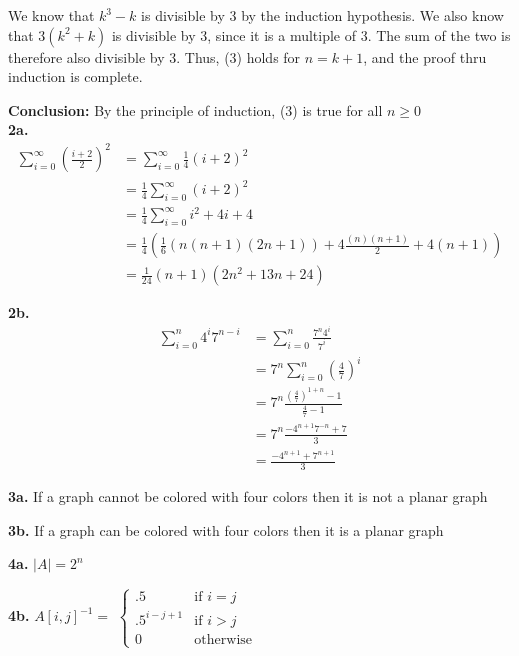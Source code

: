 \documentclass[12pt]{article}
\begin{document}
	
	We know that $ k^3 -k $ is divisible by 3 by the induction hypothesis. We also know that $ 3(k^2 + k )$ is divisible by 3, since it is a multiple of 3. The sum of the two is therefore also divisible by 3.   	Thus, (3) holds for $ n = k + 1 $, and the proof thru induction  is complete.

	\textbf{Conclusion:} By the principle of induction, (3) is true for all $ n \geq 0 $ \\
	
	\textbf{2a.} 
	\begin{equation}
	\begin{split}
	\sum_{i=0}^{\infty} (\frac{i+2}{2})^2 & = \sum_{i=0}^{\infty} \frac{1}{4} (i+2)^2\\
	& = \frac{1}{4} \sum_{i=0}^{\infty} (i+2)^2 \\
	& = \frac{1}{4} \sum_{i=0}^{\infty} i^2 + 4i + 4 \\
    & = \frac{1}{4} (\frac{1}{6}(n (n + 1) (2 n + 1) ) + 4\frac{(n)(n+1)}{2} + 4(n+1) ) \\
    & = \frac{1}{24} (n+1) (2 n^2 + 13n + 24)
  	\end{split}
	\end{equation}


	\textbf{2b.} 
	\begin{equation}
	\begin{split}
	\sum_{i=0}^{n} 4^i 7^{n-i} & = \sum_{i=0}^{n} \frac{7^n 4^i}{7^i} \\
	& = 7^n \sum_{i=0}^{n} (\frac{4}{7})^i \\
	& = 7^n \frac{(\frac{4}{7})^{1 + n} -1 }{\frac{4}{7} -1 } \\
	& = 7^n \frac{- 4^{n+1} 7^{-n} + 7 }{3} \\
	& = \frac{-4^{n+1} + 7^{n+1}}{3} 
	\end{split}
	\end{equation}	
	
	\textbf{3a.}
	If a graph cannot be colored with four colors then it is not a planar graph
	 
	\textbf{3b.}
	If a graph can be colored with four colors then it is a planar graph
	
	\textbf{4a.}
	$ |A| = 2^n $
	
	\textbf{4b.}
	$ A[i,j]^{-1} = $ 
	$\begin{cases} .5  & \mbox{if } i = j  \\  .5^{i-j+1}   & \mbox{if } i>j \\ 0   & \mbox{otherwise} \end{cases}$
	
\end{document}
